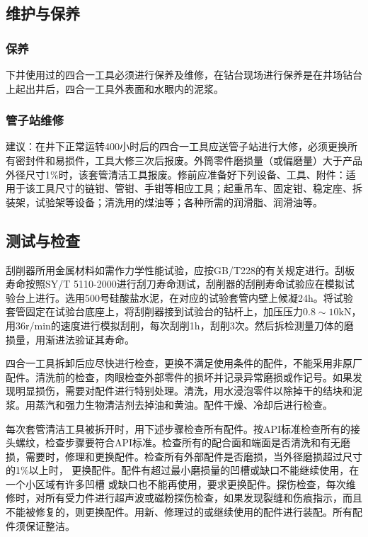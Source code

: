 
\subsection{维护与保养}
\subsubsection{保养}
下井使用过的四合一工具必须进行保养及维修，在钻台现场进行保养是在井场钻台上起出井后，四合一工具外表面和水眼内的泥浆。

\subsubsection{管子站维修}
建议：在井下正常运转400小时后的四合一工具应送管子站进行大修，必须更换所有密封件和易损件，工具大修三次后报废。外筒零件磨损量（或偏磨量）大于产品外径尺寸1\%时，该套管清洁工具报废。修前应准备好下列设备、工具、附件：适用于该工具尺寸的链钳、管钳、手钳等相应工具；起重吊车、固定钳、稳定座、拆装架，试验架等设备；清洗用的煤油等；各种所需的润滑脂、润滑油等。

\subsection{测试与检查}

刮削器所用金属材料如需作力学性能试验，应按GB/T228的有关规定进行。刮板寿命按照SY/T 5110-2000进行刮刀寿命测试，刮削器的刮削寿命试验应在模拟试验台上进行。选用500号硅酸盐水泥，在对应的试验套管内壁上候凝24h。将试验套管固定在试验台底座上，将刮削器接到试验台的钻杆上，加压压力$0.8\sim10\mathrm{kN}$，用$36\mathrm{r/min}$的速度进行模拟刮削，每次刮削1h，刮削3次。然后拆检测量刀体的磨损量，用渐进法验证其寿命。

四合一工具拆卸后应尽快进行检查，更换不满足使用条件的配件，不能采用非原厂配件。清洗前的检查，肉眼检查外部零件的损坏并记录异常磨损或作记号。如果发现明显损伤，需要对配件进行特别处理。清洗，用水浸泡零件以除掉干的结块和泥浆。用蒸汽和强力生物清洁剂去掉油和黄油。配件干燥、冷却后进行检查。

每次套管清洁工具被拆开时，用下述步骤检查所有配件。按API标准检查所有的接头螺纹，检查步骤要符合API标准。检查所有的配合面和端面是否清洗和有无磨损，需要时，修理和更换配件。检查所有外部配件是否磨损，当外径磨损超过尺寸的1\%以上时， 更换配件。配件有超过最小磨损量的凹槽或缺口不能继续使用，在一个小区域有许多凹槽 或缺口也不能再使用，要求更换配件。探伤检查，每次维修时，对所有受力件进行超声波或磁粉探伤检查，如果发现裂缝和伤痕指示，而且不能被修复的，则更换配件。用新、修理过的或继续使用的配件进行装配。所有配件须保证整洁。

